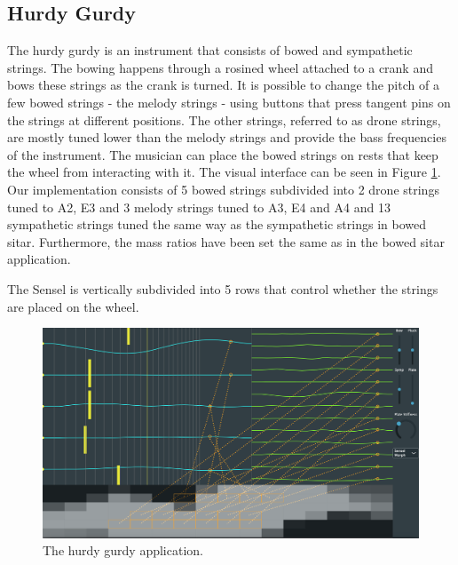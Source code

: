     \subsection{Hurdy Gurdy}
    The hurdy gurdy is an instrument that consists of bowed and sympathetic strings. The bowing happens through a rosined wheel attached to a crank and bows these strings as the crank is turned. It is possible to change the pitch of a few bowed strings - the melody strings - using buttons that press tangent pins on the strings at different positions. The other strings, referred to as drone strings, are mostly tuned lower than the melody strings and provide the bass frequencies of the instrument. The musician can place the bowed strings on rests that keep the wheel from interacting with it. 
    The visual interface can be seen in Figure \ref{fig:hurdyGurdy}.
    Our implementation consists of 5 bowed strings subdivided into 2 drone strings tuned to A2, E3 and 3 melody strings tuned to A3, E4 and A4 and 13 sympathetic strings tuned the same way as the sympathetic strings in bowed sitar. Furthermore, the mass ratios have been set the same as in the bowed sitar application.
    
    The Sensel is vertically subdivided into 5 rows that control whether the strings are placed on the wheel. 
    
    \begin{figure}[h]
    \centering
    \includegraphics[width=\paperFigWidth\textwidth]{figures/HurdyGurdy.png}
    \caption{The hurdy gurdy application. \label{fig:hurdyGurdy}}
    \end{figure}